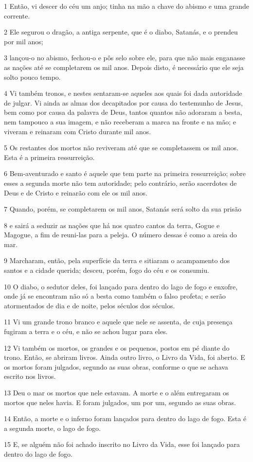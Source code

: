 \par 1 Então, vi descer do céu um anjo; tinha na mão a chave do abismo e uma grande corrente.
\par 2 Ele segurou o dragão, a antiga serpente, que é o diabo, Satanás, e o prendeu por mil anos;
\par 3 lançou-o no abismo, fechou-o e pôs selo sobre ele, para que não mais enganasse as nações até se completarem os mil anos. Depois disto, é necessário que ele seja solto pouco tempo.
\par 4 Vi também tronos, e nestes sentaram-se aqueles aos quais foi dada autoridade de julgar. Vi ainda as almas dos decapitados por causa do testemunho de Jesus, bem como por causa da palavra de Deus, tantos quantos não adoraram a besta, nem tampouco a sua imagem, e não receberam a marca na fronte e na mão; e viveram e reinaram com Cristo durante mil anos.
\par 5 Os restantes dos mortos não reviveram até que se completassem os mil anos. Esta é a primeira ressurreição.
\par 6 Bem-aventurado e santo é aquele que tem parte na primeira ressurreição; sobre esses a segunda morte não tem autoridade; pelo contrário, serão sacerdotes de Deus e de Cristo e reinarão com ele os mil anos.
\par 7 Quando, porém, se completarem os mil anos, Satanás será solto da sua prisão
\par 8 e sairá a seduzir as nações que há nos quatro cantos da terra, Gogue e Magogue, a fim de reuni-las para a peleja. O número dessas é como a areia do mar.
\par 9 Marcharam, então, pela superfície da terra e sitiaram o acampamento dos santos e a cidade querida; desceu, porém, fogo do céu e os consumiu.
\par 10 O diabo, o sedutor deles, foi lançado para dentro do lago de fogo e enxofre, onde já se encontram não só a besta como também o falso profeta; e serão atormentados de dia e de noite, pelos séculos dos séculos.
\par 11 Vi um grande trono branco e aquele que nele se assenta, de cuja presença fugiram a terra e o céu, e não se achou lugar para eles.
\par 12 Vi também os mortos, os grandes e os pequenos, postos em pé diante do trono. Então, se abriram livros. Ainda outro livro, o Livro da Vida, foi aberto. E os mortos foram julgados, segundo as suas obras, conforme o que se achava escrito nos livros.
\par 13 Deu o mar os mortos que nele estavam. A morte e o além entregaram os mortos que neles havia. E foram julgados, um por um, segundo as suas obras.
\par 14 Então, a morte e o inferno foram lançados para dentro do lago de fogo. Esta é a segunda morte, o lago de fogo.
\par 15 E, se alguém não foi achado inscrito no Livro da Vida, esse foi lançado para dentro do lago de fogo.

